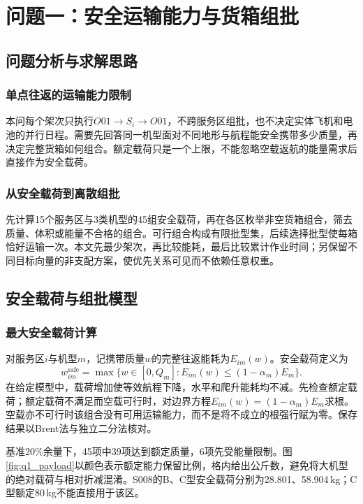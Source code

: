 \section{问题一：安全运输能力与货箱组批}
\label{sec:q1}

\subsection{问题分析与求解思路}
\subsubsection{单点往返的运输能力限制}
本问每个架次只执行$O01\to S_i\to O01$，不跨服务区组批，也不决定实体飞机和电池的并行日程。需要先回答同一机型面对不同地形与航程能安全携带多少质量，再决定完整货箱如何组合。额定载荷只是一个上限，不能忽略空载返航的能量需求后直接作为安全载荷。

\subsubsection{从安全载荷到离散组批}
先计算15个服务区与3类机型的45组安全载荷，再在各区枚举非空货箱组合，筛去质量、体积或能量不合格的组合。可行组合构成有限批型集，后续选择批型使每箱恰好运输一次。本文先最少架次，再比较能耗，最后比较累计作业时间；另保留不同目标向量的非支配方案，使优先关系可见而不依赖任意权重。

\subsection{安全载荷与组批模型}
\subsubsection{最大安全载荷计算}
对服务区$i$与机型$m$，记携带质量$w$的完整往返能耗为$E_{im}(w)$。安全载荷定义为
\begin{equation}
 w_{im}^{\mathrm{safe}}=\max\{w\in[0,Q_m]:E_{im}(w)\le(1-\alpha_m)E_m\}.
\label{eq:q1_safe_payload}
\end{equation}
在给定模型中，载荷增加使等效航程下降，水平和爬升能耗均不减。先检查额定载荷；额定载荷不满足而空载可行时，对边界方程$E_{im}(w)=(1-\alpha_m)E_m$求根。空载亦不可行时该组合没有可用运输能力，而不是将不成立的根强行赋为零。保存结果以Brent法与独立二分法核对。

基准20\%余量下，45项中39项达到额定质量，6项先受能量限制。图\ref{fig:q1_payload}以颜色表示额定能力保留比例，格内给出公斤数，避免将大机型的绝对载荷与相对折减混淆。S008的B、C型安全载荷分别为28.801、58.904\,kg；C型额定80\,kg不能直接用于该区。

